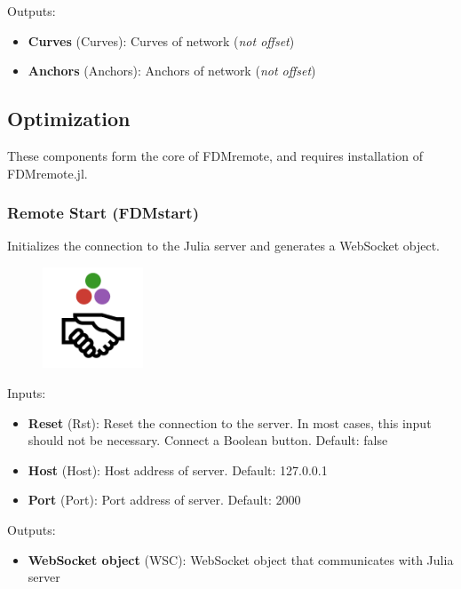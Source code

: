 Outputs:
\begin{itemize}
    \setlength\itemsep{0.05em}
    \item \textbf{Curves} (Curves): Curves of network (\textit{not offset})
    \item \textbf{Anchors} (Anchors): Anchors of network (\textit{not offset})
\end{itemize}

\subsection{Optimization} \label{Optimization}
These components form the core of FDMremote, and requires installation of FDMremote.jl. 

\subsubsection{Remote Start (FDMstart)} \label{FDMstart}
Initializes the connection to the Julia server and generates a WebSocket object.

\begin{figure}[h]
    \centering
    \includegraphics[width=3cm]{Figures/start.png}
\end{figure}

Inputs:
\begin{itemize}
    \setlength\itemsep{0.05em}
    \item \textbf{Reset} (Rst): Reset the connection to the server. In most cases, this input should not be necessary. Connect a Boolean button. {\color{gray} Default: false}
    \item \textbf{Host} (Host): Host address of server. {\color{gray} Default: 127.0.0.1}
    \item \textbf{Port} (Port): Port address of server. {\color{gray} Default: 2000}
\end{itemize}

Outputs:
\begin{itemize}
    \setlength\itemsep{0.05em}
    \item \textbf{WebSocket object} (WSC): WebSocket object that communicates with Julia server 
\end{itemize}

